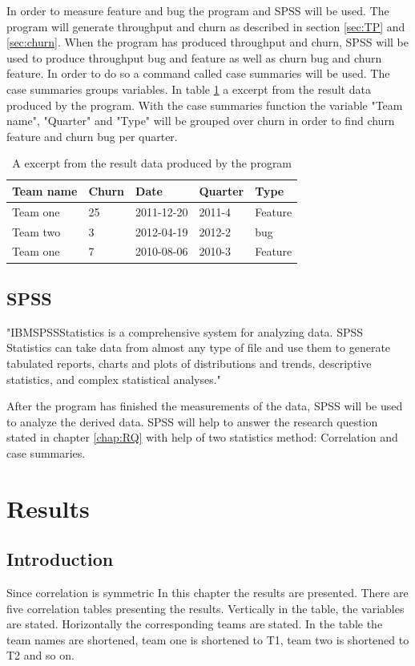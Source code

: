 \documentclass[UKenglish]{ifimaster}  %
\begin{document}
In order to measure feature and bug the program and SPSS will be used. The program will generate throughput and churn as described in section \ref{sec:TP} and \ref{sec:churn}. When the program has produced throughput and churn, SPSS will be used to produce throughput bug and feature as well as churn bug and churn feature. In order to do so a command called case summaries will be used. The case summaries groups variables. In table \ref{tab:ftb} a excerpt from the result data produced by the program.  With the case summaries function the variable "Team name", "Quarter" and "Type" will be grouped over churn in order to find churn feature and churn bug per quarter. 


\begin{table}[!ht]
\center
\begin{tabular}{ | l | l | l | l | l | }
\hline
	Team name & Churn & Date & Quarter & Type \\ \hline
	Team one & 25 &2011-12-20& 2011-4 & Feature \\ \hline
	Team two & 3 &2012-04-19 & 2012-2 & bug \\ \hline
	Team one & 7 & 2010-08-06 & 2010-3 & Feature \\ \hline
\end{tabular}
\caption{A excerpt from the result data produced by the program }
\label{tab:ftb} 
\end{table}

\section{SPSS}
\label{sec:SPSS}
"IBM\circledR  SPSS\circledR Statistics is a comprehensive system for analyzing data. SPSS Statistics can take data from almost any type of file and use them to generate tabulated reports, charts and plots of distributions and trends, descriptive statistics, and complex statistical analyses." \parencite{IBM}

After the program has finished the measurements of the data, SPSS will be used to analyze the derived data. SPSS will help to answer the research question stated in chapter \ref{chap:RQ} with help of two statistics method: Correlation and case summaries. 


\chapter{Results}                     
\label{ch:res}
\section{Introduction}
Since correlation is symmetric 
In this chapter the results are presented. There are five correlation tables presenting the results. Vertically in the table, the variables are stated. Horizontally the corresponding teams are stated. In the table the team names are shortened, team one is shortened to T1, team two is shortened to T2 and so on. 
\end{document}
